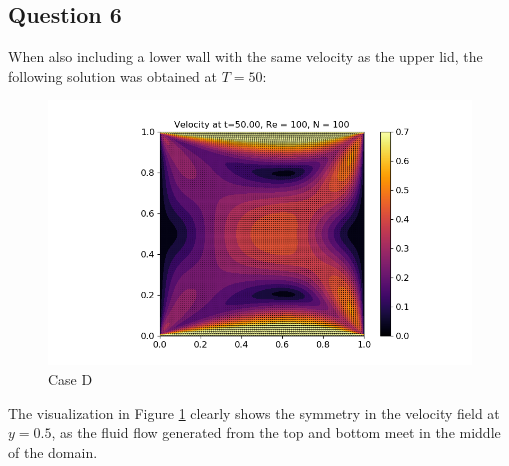 \documentclass[10pt]{report}
\begin{document}
\subsection*{Question 6}
When also including a lower wall with the same velocity as the upper lid, the following solution was
obtained at $T= 50$:
\begin{figure}[H]
    \centering
    \includegraphics[width = \textwidth]{plots/velocity_D1.png}
    \caption{Case D}
    \label{caseD1}
\end{figure}
The visualization in Figure \ref{caseD1} clearly shows the symmetry in the velocity field at $y=0.5$,
as the fluid flow generated from the top and bottom meet in the middle of the domain.
\end{document}
